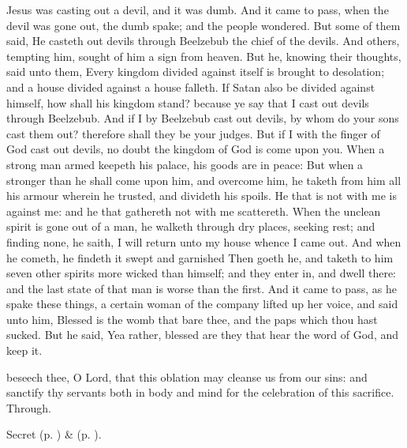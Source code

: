  Jesus was casting out a devil, and it was dumb. And it came to pass, when the devil was gone out, the dumb spake; and the people wondered. But some of them said, He casteth out devils through Beelzebub the chief of the devils. And others, tempting him, sought of him a sign from heaven. But he, knowing their thoughts, said unto them, Every kingdom divided against itself is brought to desolation; and a house divided against a house falleth. If Satan also be divided against himself, how shall his kingdom stand? because ye say that I cast out devils through Beelzebub. And if I by Beelzebub cast out devils, by whom do your sons cast them out? therefore shall they be your judges. But if I with the finger of God cast out devils, no doubt the kingdom of God is come upon you. When a strong man armed keepeth his palace, his goods are in peace: But when a stronger than he shall come upon him, and overcome him, he taketh from him all his armour wherein he trusted, and divideth his spoils. He that is not with me is against me: and he that gathereth not with me scattereth. When the unclean spirit is gone out of a man, he walketh through dry places, seeking rest; and finding none, he saith, I will return unto my house whence I came out. And when he cometh, he findeth it swept and garnished Then goeth he, and taketh to him seven other spirits more wicked than himself; and they enter in, and dwell there: and the last state of that man is worse than the first. And it came to pass, as he spake these things, a certain woman of the company lifted up her voice, and said unto him, Blessed is the womb that bare thee, and the paps which thou hast sucked. But he said, Yea rather, blessed are they that hear the word of God, and keep it.


\vspace{-0.5\baselineskip}

\secret
{} beseech thee, O Lord, that this oblation may cleanse us from our sins: and sanctify thy servants both in body and mind for the celebration of this sacrifice. Through.

\begin{rubric}
     Secret  (p. \pageref{AshWednesdayMassSecret}) \&   (p. \pageref{SPLivingDeparted}).
\end{rubric}

